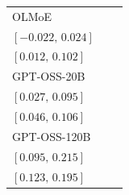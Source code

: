 \begin{tabular*}{\linewidth}{@{\extracolsep{\fill}}lcc@{}}
OLMoE & \begin{tabular}[t]{@{}c@{}}\(0.001\)\\\([-0.022,\,0.024]\)\end{tabular} & \begin{tabular}[t]{@{}c@{}}\(0.056\)\\\([0.012,\,0.102]\)\end{tabular}\\[2pt]
GPT-OSS-20B & \begin{tabular}[t]{@{}c@{}}\(0.060\)\\\([0.027,\,0.095]\)\end{tabular} & \begin{tabular}[t]{@{}c@{}}\(0.076\)\\\([0.046,\,0.106]\)\end{tabular}\\[2pt]
GPT-OSS-120B & \begin{tabular}[t]{@{}c@{}}\(0.151\)\\\([0.095,\,0.215]\)\end{tabular} & \begin{tabular}[t]{@{}c@{}}\(0.158\)\\\([0.123,\,0.195]\)\end{tabular}\\[2pt]
\bottomrule
\end{tabular*}
\endgroup
